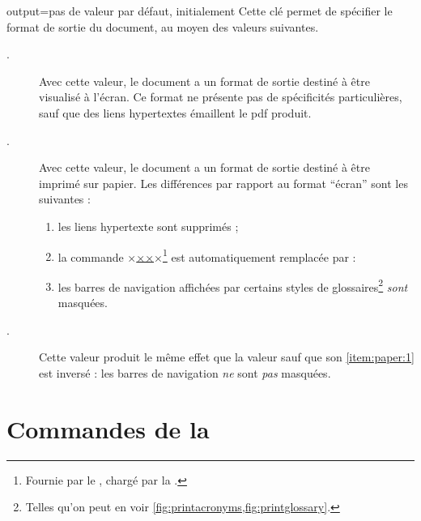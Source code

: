 \begin{docKey}{output}{=\textbar{}\textbar{}}{pas
    de valeur par défaut, initialement }
  Cette clé permet de spécifier le format de sortie du document, au moyen des
  valeurs suivantes.
  \begin{description}
  \item[.] Avec cette valeur, le document a un format de
    sortie destiné à être visualisé à l'écran. Ce format ne présente pas de
    spécificités particulières, sauf que des liens hypertextes émaillent le
    \acrshort{pdf} produit.
  \item[.] Avec cette valeur, le document a un format de sortie
    destiné à être imprimé sur papier. Les différences par rapport au format
    \enquote{écran} sont les suivantes :
    \begin{enumerate}
    \item les liens hypertexte sont supprimés ;
    \item la commande
      ×\href{×\meta{\acrshort*{url}}×}{××}×\footnote{Fournie par le
        , chargé par la \yatcl{}.} est automatiquement
      remplacée par :
    \item\label{item:paper:1} les barres de navigation affichées par certains
      styles de glossaires\footnote{Telles qu'on peut en voir
        \vref{fig:printacronyms,fig:printglossary}.} \emph{sont} masquées.
    \end{enumerate}
  \item[.] Cette valeur produit le même effet que la valeur
     sauf que son \vref{item:paper:1} est inversé : les barres
    de navigation \emph{ne} sont \emph{pas} masquées.
  \end{description}
\end{docKey}

\section{Commandes de la \yatcl}

